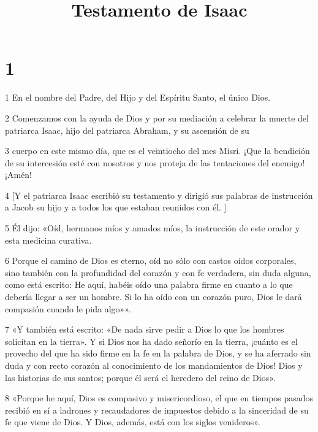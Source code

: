 


\title{Testamento de Isaac}

\chapter{1}

\par 1 En el nombre del Padre, del Hijo y del Espíritu Santo, el único Dios.

\par 2 Comenzamos con la ayuda de Dios y por su mediación a celebrar la muerte del patriarca Isaac, hijo del patriarca Abraham, y su ascensión de su

\par 3 cuerpo en este mismo día, que es el veintiocho del mes Misri. ¡Que la bendición de su intercesión esté con nosotros y nos proteja de las tentaciones del enemigo! ¡Amén!

\par 4 [Y el patriarca Isaac escribió su testamento y dirigió sus palabras de instrucción a Jacob su hijo y a todos los que estaban reunidos con él. ]

\par 5 Él dijo: «Oíd, hermanos míos y amados míos, la instrucción de este orador y esta medicina curativa.

\par 6 Porque el camino de Dios es eterno, oíd no sólo con castos oídos corporales, sino también con la profundidad del corazón y con fe verdadera, sin duda alguna, como está escrito: He aquí, habéis oído una palabra firme en cuanto a lo que debería llegar a ser un hombre. Si lo ha oído con un corazón puro, Dios le dará compasión cuando le pida algo»».

\par 7 «Y también está escrito: «De nada sirve pedir a Dios lo que los hombres solicitan en la tierra». Y si Dios nos ha dado señorío en la tierra, ¡cuánto es el provecho del que ha sido firme en la fe en la palabra de Dios, y se ha aferrado sin duda y con recto corazón al conocimiento de los mandamientos de Dios! Dios y las historias de sus santos; porque él será el heredero del reino de Dios».

\par 8 «Porque he aquí, Dios es compasivo y misericordioso, el que en tiempos pasados ​​recibió en sí a ladrones y recaudadores de impuestos debido a la sinceridad de su fe que viene de Dios. Y Dios, además, está con los siglos venideros».


